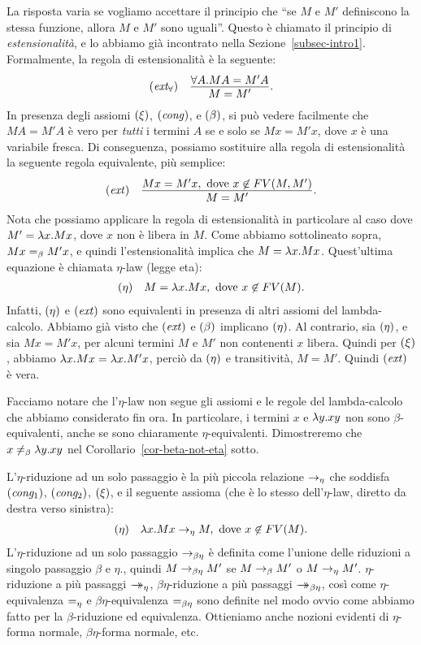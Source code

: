 \documentclass{article}
\begin{document}
La risposta varia se vogliamo accettare il principio che
``se $M$ e $M'$ definiscono la stessa funzione, allora $M$ e $M'$ sono
uguali''. Questo \`e chiamato il principio di {\em estensionalit\`a}, e lo
abbiamo gi\`a incontrato nella Sezione~\ref{subsec-intro1}. Formalmente,
la regola di estensionalit\`a \`e la seguente:
\[ \begin{array}{lc}
  \trule{ext$_\forall$} & \deriv{\forall A.MA=M'A}{M=M'}.
\end{array}
\]
In presenza degli assiomi $\textrm{(\textit{$\xi$\/})}$, $\textrm{(\textit{cong\/})}$, e
$\textrm{(\textit{$\beta$\/})}$, si pu\`o vedere facilmente che $MA=M'A$ \`e vero per {\em
  tutti} i termini $A$ se e solo se $Mx=M'x$, dove $x$ \`e una variabile
fresca. Di conseguenza, possiamo sostituire alla regola di estensionalit\`a 
la seguente regola equivalente, pi\`u semplice:
\[ \begin{array}{lc}
  \trule{ext} & \deriv{Mx=M'x, \mbox{ dove $x\not\in\FV{M,M'}$}}{M=M'}.
\end{array}
\]
Nota che possiamo applicare la regola di estensionalit\`a in particolare al
caso dove $M'=\lambda x.Mx$, dove $x$ non \`e libera in $M$. Come abbiamo
sottolineato sopra, $Mx=_{\beta} M'x$, e quindi l'estensionalit\`a implica che
$M=\lambda x.Mx$. Quest'ultima equazione \`e chiamata $\eta$-law (legge eta):
\[ \begin{array}{lc}
  \textrm{(\textit{$\eta$\/})} & M=\lambda x.Mx, \mbox{ dove $x\not\in FV(M)$}.
\end{array}
\]
Infatti, $\textrm{(\textit{$\eta$\/})}$ e $\textrm{(\textit{ext\/})}$ sono equivalenti in
presenza di altri assiomi del lambda-calcolo. Abbiamo gi\`a
visto che $\textrm{(\textit{ext\/})}$ e $\textrm{(\textit{$\beta$\/})}$ implicano $\textrm{(\textit{$\eta$\/})}$.
Al contrario, sia $\textrm{(\textit{$\eta$\/})}$, e sia $Mx=M'x$, per alcuni
termini $M$ e $M'$ non contenenti $x$ libera.  Quindi per $\textrm{(\textit{$\xi$\/})}$,
abbiamo $\lambda x.Mx=\lambda x.M'x$, perci\`o da $\textrm{(\textit{$\eta$\/})}$ e
transitivit\`a, $M=M'$. Quindi $\textrm{(\textit{ext\/})}$ \`e vera.

Facciamo notare che l'$\eta$-law non segue gli assiomi e le regole
del lambda-calcolo che abbiamo considerato fin ora. In particolare,
i termini $x$ e $\lambda y.xy$ non sono $\beta$-equivalenti, anche se
sono chiaramente $\eta$-equivalenti. Dimostreremo che $x\not=_{\beta} \lambda
y.xy$ nel Corollario~\ref{cor-beta-not-eta} sotto.

L'$\eta$-riduzione ad un solo passaggio \`e la pi\`u piccola relazione $\rightarrow_{\eta}$
che soddisfa $\textrm{(\textit{cong$_1$\/})}$, $\textrm{(\textit{cong$_2$\/})}$, $\textrm{(\textit{$\xi$\/})}$, e
il seguente assioma (che \`e lo stesso dell'$\eta$-law, diretto
da destra verso sinistra):
\[ \begin{array}{lc}\label{page-def-eta}
  \textrm{(\textit{$\eta$\/})} & \lambda x.Mx\rightarrow_{\eta} M, \mbox{ dove $x\not\in FV(M)$}.
\end{array}
\]
L'$\eta$-riduzione ad un solo passaggio $\rightarrow_{\beta\eta}$ \`e definita come l'unione
delle riduzioni a singolo passaggio $\beta$ e $\eta$., quindi $M\rightarrow_{\beta\eta} M'$ se
$M\rightarrow_{\beta} M'$ o $M\rightarrow_{\eta} M'$. $\eta$-riduzione a pi\`u passaggi $\mathrel{\rightarrow\!\!\!\!\!\rightarrow}_{\eta}$,
$\beta\eta$-riduzione a pi\`u passaggi $\mathrel{\rightarrow\!\!\!\!\!\rightarrow}_{\beta\eta}$, cos\`i come
$\eta$-equivalenza $=_{\eta}$ e $\beta\eta$-equivalenza $=_{\beta\eta}$ sono
definite nel modo ovvio come abbiamo fatto per la $\beta$-riduzione ed
equivalenza. Ottieniamo anche nozioni evidenti di $\eta$-forma normale,
$\beta\eta$-forma normale, etc.
\end{document}
